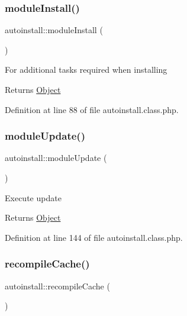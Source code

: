 \subsubsection{\texorpdfstring{module\+Install()}{moduleInstall()}}
{\footnotesize\ttfamily autoinstall\+::module\+Install (\begin{DoxyParamCaption}{ }\end{DoxyParamCaption})}

For additional tasks required when installing

\begin{DoxyReturn}{Returns}
\hyperlink{classObject}{Object} 
\end{DoxyReturn}


Definition at line 88 of file autoinstall.\+class.\+php.

\hypertarget{classautoinstall_a856f1e61cac8e20ed0df58a6a10f61a8}{}\label{classautoinstall_a856f1e61cac8e20ed0df58a6a10f61a8} 
\subsubsection{\texorpdfstring{module\+Update()}{moduleUpdate()}}
{\footnotesize\ttfamily autoinstall\+::module\+Update (\begin{DoxyParamCaption}{ }\end{DoxyParamCaption})}

Execute update

\begin{DoxyReturn}{Returns}
\hyperlink{classObject}{Object} 
\end{DoxyReturn}


Definition at line 144 of file autoinstall.\+class.\+php.

\hypertarget{classautoinstall_a7455962a1f07ea4c4e28971fa8dde715}{}\label{classautoinstall_a7455962a1f07ea4c4e28971fa8dde715} 
\subsubsection{\texorpdfstring{recompile\+Cache()}{recompileCache()}}
{\footnotesize\ttfamily autoinstall\+::recompile\+Cache (\begin{DoxyParamCaption}{ }\end{DoxyParamCaption})}

